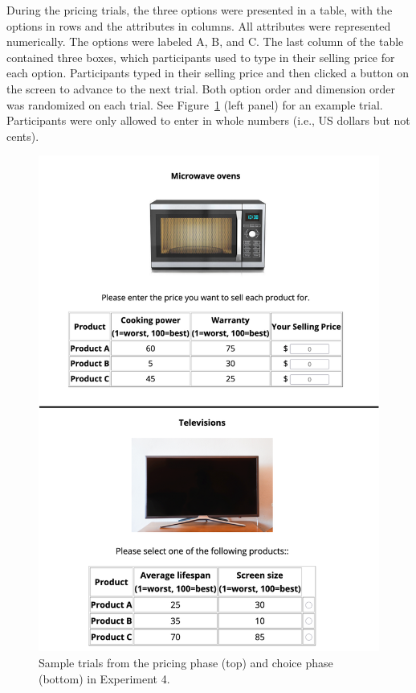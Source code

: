During the pricing trials, the three options were presented in a table, with the options in rows and the attributes in columns. All attributes were represented numerically. The options were labeled A, B, and C. The last column of the table contained three boxes, which participants used to type in their selling price for each option. Participants typed in their selling price and then clicked a button on the screen to advance to the next trial. Both option order and dimension order was randomized on each trial. See Figure~\ref{fig:ce_rating_choice_trial} (left panel) for an example trial. Participants were only allowed to enter in whole numbers (i.e., US dollars but not cents).

\begin{figure}
    \centering
    \includegraphics{figures/ce_rating_choice_example_trial.jpg}
    \caption{Sample trials from the pricing phase (top) and choice phase (bottom) in Experiment 4.}
    \label{fig:ce_rating_choice_trial}
\end{figure}

